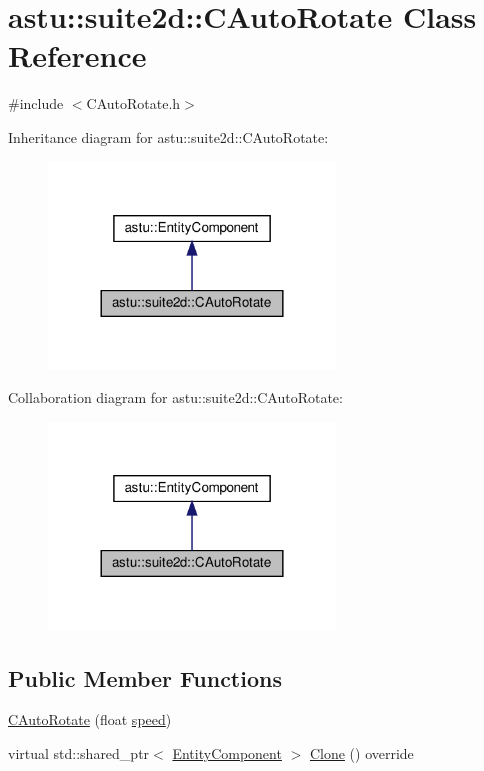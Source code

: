 \hypertarget{classastu_1_1suite2d_1_1CAutoRotate}{}\section{astu\+:\+:suite2d\+:\+:C\+Auto\+Rotate Class Reference}
\label{classastu_1_1suite2d_1_1CAutoRotate}


{\ttfamily \#include $<$C\+Auto\+Rotate.\+h$>$}



Inheritance diagram for astu\+:\+:suite2d\+:\+:C\+Auto\+Rotate\+:\nopagebreak
\begin{figure}[H]
\begin{center}
\leavevmode
\includegraphics[width=216pt]{classastu_1_1suite2d_1_1CAutoRotate__inherit__graph}
\end{center}
\end{figure}


Collaboration diagram for astu\+:\+:suite2d\+:\+:C\+Auto\+Rotate\+:\nopagebreak
\begin{figure}[H]
\begin{center}
\leavevmode
\includegraphics[width=216pt]{classastu_1_1suite2d_1_1CAutoRotate__coll__graph}
\end{center}
\end{figure}
\subsection*{Public Member Functions}
\begin{DoxyCompactItemize}
\item 
\hyperlink{classastu_1_1suite2d_1_1CAutoRotate_a53a16efe41829470f66eb471d2f196ce}{C\+Auto\+Rotate} (float \hyperlink{classastu_1_1suite2d_1_1CAutoRotate_a5757c237b7c9b14fdc43ff763e7b899b}{speed})
\item 
virtual std\+::shared\+\_\+ptr$<$ \hyperlink{classastu_1_1EntityComponent}{Entity\+Component} $>$ \hyperlink{classastu_1_1suite2d_1_1CAutoRotate_af130721018671489c7de3f652ffcc8cf}{Clone} () override
\end{DoxyCompactItemize}
